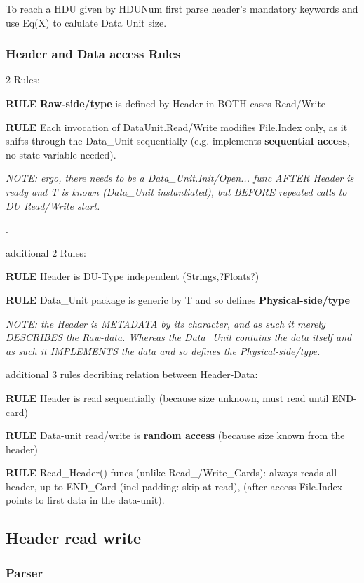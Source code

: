 \documentclass[a4paper,10pt]{article}
\begin{document}
To reach a HDU given by HDUNum first parse header's mandatory keywords and use Eq(X)
to calulate Data Unit size. 


\subsubsection{Header and Data access Rules}

2 Rules:

\textbf{RULE} \textbf{Raw-side/type} is defined by Header in BOTH cases Read/Write

\textbf{RULE} Each invocation of DataUnit.Read/Write modifies File.Index only, as it shifts through the Data\_Unit sequentially (e.g. implements \textbf{sequential access}, no state variable needed).

\textit{NOTE: ergo, there needs to be a Data\_Unit.Init/Open... func AFTER Header is ready and T is known (Data\_Unit instantiated), but BEFORE repeated calls to DU Read/Write start.}

.

additional 2 Rules:

\textbf{RULE} Header is DU-Type independent (Strings,?Floats?)

\textbf{RULE} Data\_Unit package is generic by T and so defines \textbf{Physical-side/type}

\textit{NOTE: the Header is METADATA by its character, and as such it merely DESCRIBES
the Raw-data. Whereas the Data\_Unit contains the data itself and as such it IMPLEMENTS
the data and so defines the Physical-side/type.}

additional 3 rules decribing relation between Header-Data:

\textbf{RULE} Header is read sequentially (because size unknown, must read until END-card)

\textbf{RULE} Data-unit read/write is \textbf{random access} (because size known from the header)

\textbf{RULE} Read\_Header() funcs (unlike Read\_/Write\_Cards):
always reads all header, up to END\_Card (incl padding: skip at read), (after access
File.Index points to first data in the data-unit).





\subsection{Header read write}

\subsubsection{Parser}
\end{document}
